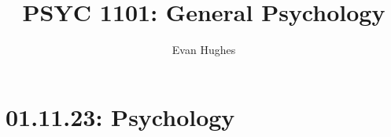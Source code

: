 \documentclass{article}
\title{PSYC 1101: General Psychology}
\author{Evan Hughes}
\begin{document}
\maketitle
\section*{01.11.23: Psychology}
\end{document}
